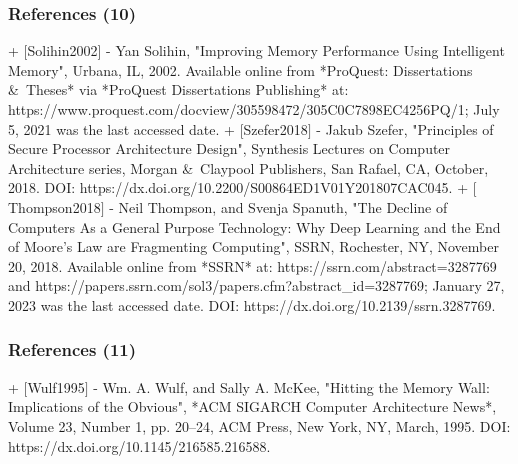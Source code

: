 \begin{frame}
	\frametitle{References (10)}

+ $[$Solihin2002$]$
	- Yan Solihin, "Improving Memory Performance Using Intelligent Memory", Urbana, {IL}, 2002. Available online from *{ProQuest}: Dissertations {\rm \&}\ Theses* via *{ProQuest} Dissertations Publishing* at: https://www.proquest.com/docview/305598472/305C0C7898EC4256PQ/1; July 5, 2021 was the last accessed date.
+ $[$Szefer2018$]$
	- Jakub Szefer, "Principles of Secure Processor Architecture Design", Synthesis Lectures on Computer Architecture series, Morgan {\rm \&}\ Claypool Publishers, San Rafael, {CA}, October, 2018. DOI: https://dx.doi.org/10.2200/S00864ED1V01Y201807CAC045.
+ $[$Thompson2018$]$
	- Neil Thompson, and Svenja Spanuth, "The Decline of Computers As a General Purpose Technology: Why Deep Learning and the End of Moore's Law are Fragmenting Computing", {SSRN}, Rochester, {NY}, November 20, 2018. Available online from *SSRN* at: https://ssrn.com/abstract=3287769 and https://papers.ssrn.com/sol3/papers.cfm?abstract_id=3287769; January 27, 2023 was the last accessed date. DOI: https://dx.doi.org/10.2139/ssrn.3287769.


\end{frame}




















\begin{frame}
	\frametitle{References (11)}

+ $[$Wulf1995$]$
	- Wm. A. Wulf, and Sally A. {McKee}, "Hitting the Memory Wall: Implications of the Obvious", *{ACM SIGARCH} Computer Architecture News*, Volume 23, Number 1, pp. 20--24, {ACM} Press, New York, {NY}, March, 1995. DOI: https://dx.doi.org/10.1145/216585.216588.


\end{frame}




















